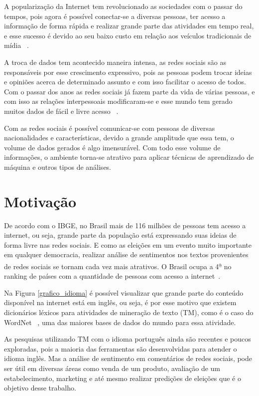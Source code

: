 A popularização da Internet tem revolucionado as sociedades com o passar do tempos,
pois agora é possível conectar-se a diversas pessoas, ter acesso a informação de forma rápida
e realizar grande parte das atividades  em tempo real, e esse sucesso é devido ao seu baixo custo
em relação aos veículos tradicionais de mídia ~\cite{song2014analyzing}. 

A troca de dados tem acontecido maneira intensa, as redes sociais são as responsáveis por esse crescimento
expressivo, pois as pessoas podem trocar ideias e opiniões acerca de determinado assunto e com isso facilitar
o acesso de todos. Com o passar dos anos as redes sociais já fazem parte da vida de várias pessoas, e com isso as relações 
interpessoais modificaram-se e esse mundo tem gerado muitos dados de fácil e livre acesso ~\cite{5194581}.

Com as redes sociais é possível comunicar-se com pessoas de diversas nacionalidades e características, devido
a grande amplitude que essa tem, o volume de dados gerados é algo imensurável. 
Com todo esse volume de informações, o ambiente torna-se atrativo para aplicar técnicas de aprendizado de
máquina e outros tipos de análises.
\section{Motivação}

De acordo com o \acrshort{IBGE}, no Brasil mais de 116 milhões de pessoas tem acesso a internet, ou seja, grande parte da população está expressando suas ideias
de forma livre nas redes sociais. E como as eleições em um evento muito importante em qualquer democracia, realizar análise de sentimentos nos textos 
provenientes de redes sociais se tornam cada vez mais atrativos. O Brasil ocupa a 4\textsuperscript{\b{a}} no ranking de países com a quantidade de pessoas com acesso a internet~\cite{ILS}.

Na Figura \ref{grafico_idioma} é possível visualizar que grande parte do conteúdo disponível na internet está em inglês, ou seja, é por esse motivo que
existem dicionários léxicos para atividades de mineração de texto (\acrshort{TM}), como é o caso do WordNet ~\cite{miller1995wordnet}, uma das maiores bases de dados do mundo para essa atividade. 

As pesquisas utilizando \acrshort{TM} com o idioma português ainda são recentes e poucos exploradas, pois a maioria das ferramentas são desenvolvidas para atender o idioma inglês. Mas a análise
de sentimento em comentários de redes sociais, pode ser útil em diversas áreas como venda de um produto, avaliação de um estabelecimento, marketing e até mesmo realizar predições de eleições que é o objetivo desse trabalho.


